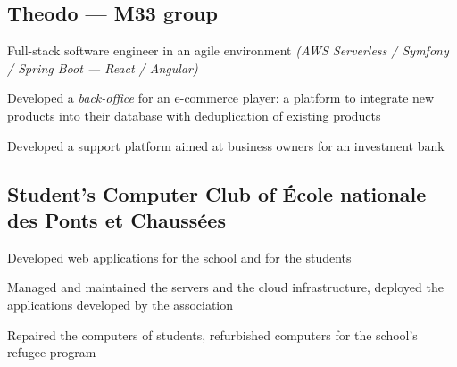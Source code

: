 \subsection{{Theodo --- M33 group}}
\begin{leftbar}
    \begin{zitemize}
        \item Full-stack software engineer in an agile environment \textit{(AWS Serverless / Symfony / Spring Boot --- React / Angular)}
        \item Developed a \textit{back-office} for an e-commerce player: a platform to integrate new products into their database with deduplication of existing products
        \item Developed a support platform aimed at business owners for an investment bank
    \end{zitemize}
\end{leftbar}
\subsection{{Student's Computer Club of École nationale des Ponts et Chaussées}}
\begin{leftbar}
    \begin{zitemize}
        \item Developed web applications for the school and for the students
        \item Managed and maintained the servers and the cloud infrastructure, deployed the applications developed by the association
        \item Repaired the computers of students, refurbished computers for the school's refugee program
    \end{zitemize}
\end{leftbar}
